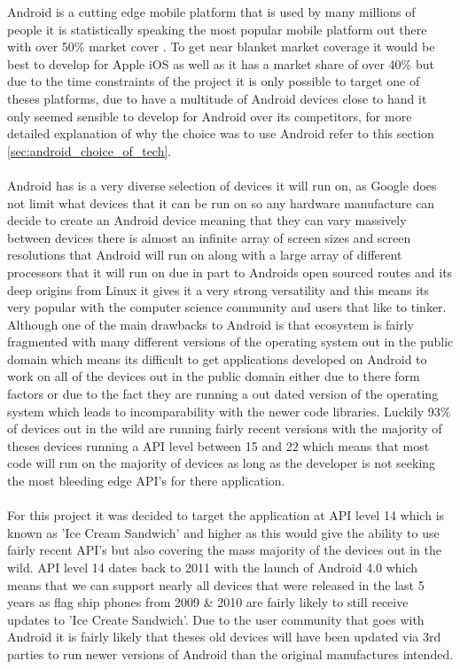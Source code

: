 Android is a cutting edge mobile platform that is used by many millions of people it is statistically speaking the most popular mobile platform out there with over 50\% market cover \cite{statista:devicestats:2015:online}. To get near blanket market coverage it would be best to develop for Apple iOS as well as it has a market share of over 40\% but due to the time constraints of the project it is only possible to target one of theses platforms, due to have a multitude of Android devices close to hand it only seemed sensible to develop for Android over its competitors, for more detailed explanation of why the choice was to use Android refer to this section \ref{sec:android_choice_of_tech}.\\
\\
Android has is a very diverse selection of devices it will run on, as Google does not limit what devices that it can be run on so any hardware manufacture can decide to create an Android device meaning that they can vary massively between devices there is almost an infinite array of screen sizes and screen resolutions that Android will run on along with a large array of different processors that it will run on due in part to Androids open sourced routes and its deep origins from Linux it gives it a very strong versatility and this means its very popular with the computer science community and users that like to tinker. Although one of the main drawbacks to Android is that ecosystem is fairly fragmented with many different versions of the operating system out in the public domain which means its difficult to get applications developed on Android to work on all of the devices out in the public domain either due to there form factors or due to the fact they are running a out dated version of the operating system which leads to incomparability with the newer code libraries. Luckily 93\% of devices \cite{google:osstats:2015:online} out in the wild are running fairly recent versions with the majority of theses devices running a API level between 15 and 22 which means that most code will run on the majority of devices as long as the developer is not seeking the most bleeding edge API's for there application.\\
\\
For this project it was decided to target the application at API level 14 which is known as 'Ice Cream Sandwich' and higher as this would give the ability to use fairly recent API's but also covering the mass majority of the devices out in the wild. API level 14 dates back to 2011 with the launch of Android 4.0 which means that we can support nearly all devices that were released in the last 5 years as flag ship phones from 2009 \& 2010 are fairly likely to still receive updates to 'Ice Create Sandwich'. Due to the user community that goes with Android it is fairly likely that theses old devices will have been updated via 3rd parties to run newer versions of Android than the original manufactures intended.\\
